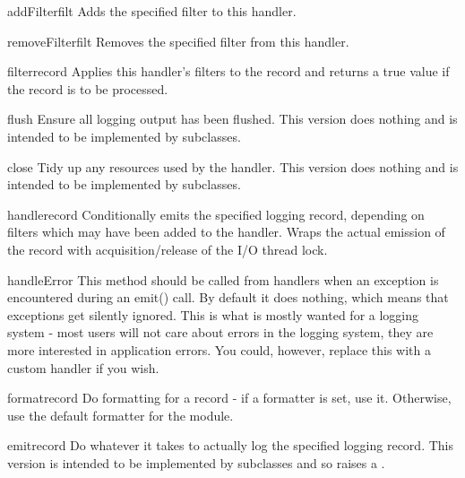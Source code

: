 \begin{methoddesc}{addFilter}{filt}
Adds the specified filter  to this handler.
\end{methoddesc}

\begin{methoddesc}{removeFilter}{filt}
Removes the specified filter  from this handler.
\end{methoddesc}

\begin{methoddesc}{filter}{record}
Applies this handler's filters to the record and returns a true value if
the record is to be processed.
\end{methoddesc}

\begin{methoddesc}{flush}{}
Ensure all logging output has been flushed. This version does
nothing and is intended to be implemented by subclasses.
\end{methoddesc}

\begin{methoddesc}{close}{}
Tidy up any resources used by the handler. This version does
nothing and is intended to be implemented by subclasses.
\end{methoddesc}

\begin{methoddesc}{handle}{record}
Conditionally emits the specified logging record, depending on
filters which may have been added to the handler. Wraps the actual
emission of the record with acquisition/release of the I/O thread
lock.
\end{methoddesc}

\begin{methoddesc}{handleError}{}
This method should be called from handlers when an exception is
encountered during an emit() call. By default it does nothing,
which means that exceptions get silently ignored. This is what is
mostly wanted for a logging system - most users will not care
about errors in the logging system, they are more interested in
application errors. You could, however, replace this with a custom
handler if you wish.
\end{methoddesc}

\begin{methoddesc}{format}{record}
Do formatting for a record - if a formatter is set, use it.
Otherwise, use the default formatter for the module.
\end{methoddesc}

\begin{methoddesc}{emit}{record}
Do whatever it takes to actually log the specified logging record.
This version is intended to be implemented by subclasses and so
raises a .
\end{methoddesc}

